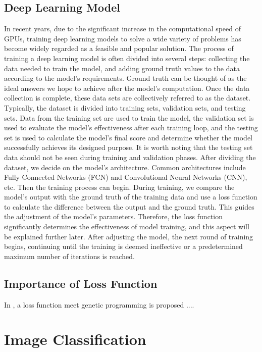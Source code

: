 \begin{ZhChapter}
    \subsection{Deep Learning Model}
    In recent years, due to the significant increase in the computational speed of GPUs, training deep learning models to solve a wide variety of problems has become widely regarded as a feasible and popular solution. The process of training a deep learning model is often divided into several steps: collecting the data needed to train the model, and adding ground truth values to the data according to the model's requirements. Ground truth can be thought of as the ideal answers we hope to achieve after the model's computation. Once the data collection is complete, these data sets are collectively referred to as the dataset. Typically, the dataset is divided into training sets, validation sets, and testing sets. Data from the training set are used to train the model, the validation set is used to evaluate the model's effectiveness after each training loop, and the testing set is used to calculate the model's final score and determine whether the model successfully achieves its designed purpose. It is worth noting that the testing set data should not be seen during training and validation phases. After dividing the dataset, we decide on the model's architecture. Common architectures include Fully Connected Networks (FCN) and Convolutional Neural Networks (CNN), etc. Then the training process can begin. During training, we compare the model's output with the ground truth of the training data and use a loss function to calculate the difference between the output and the ground truth. This guides the adjustment of the model's parameters. Therefore, the loss function significantly determines the effectiveness of model training, and this aspect will be explained further later. After adjusting the model, the next round of training begins, continuing until the training is deemed ineffective or a predetermined maximum number of iterations is reached.
    \subsection{Importance of Loss Function}
    In \cite{gonzalez2020improvedtrainingspeedaccuracy}, a loss function meet genetic programming is proposed ....
    \section{Image Classification}


\end{ZhChapter}
